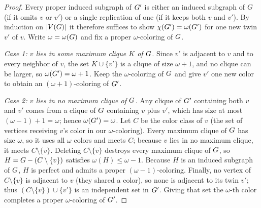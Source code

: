 \begin{proof}
Every proper induced subgraph of $G'$ is either an induced subgraph of $G$ (if it omits $v$ or $v'$) or a single replication of one (if it keeps both $v$ and $v'$). By induction on $\lvert V(G)\rvert$ it therefore suffices to show $\chi(G')=\omega(G')$ for one new twin $v'$ of $v$. Write $\omega=\omega(G)$ and fix a proper $\omega$-coloring of $G$.

\emph{Case 1: $v$ lies in some maximum clique $K$ of $G$.} Since $v'$ is adjacent to $v$ and to every neighbor of $v$, the set $K\cup\{v'\}$ is a clique of size $\omega+1$, and no clique can be larger, so $\omega(G')=\omega+1$. Keep the $\omega$-coloring of $G$ and give $v'$ one new color to obtain an $(\omega+1)$-coloring of $G'$.

\emph{Case 2: $v$ lies in no maximum clique of $G$.} Any clique of $G'$ containing both $v$ and $v'$ comes from a clique of $G$ containing $v$ plus $v'$, which has size at most $(\omega-1)+1=\omega$; hence $\omega(G')=\omega$. Let $C$ be the color class of $v$ (the set of vertices receiving $v$'s color in our $\omega$-coloring). Every maximum clique of $G$ has size $\omega$, so it uses all $\omega$ colors and meets $C$; because $v$ lies in no maximum clique, it meets $C\setminus\{v\}$. Deleting $C\setminus\{v\}$ destroys every maximum clique of $G$, so $H=G-(C\setminus\{v\})$ satisfies $\omega(H)\le\omega-1$. Because $H$ is an induced subgraph of $G$, $H$ is perfect and admits a proper $(\omega-1)$-coloring. Finally, no vertex of $C\setminus\{v\}$ is adjacent to $v$ (they shared a color), so none is adjacent to its twin $v'$; thus $(C\setminus\{v\})\cup\{v'\}$ is an independent set in $G'$. Giving that set the $\omega$-th color completes a proper $\omega$-coloring of $G'$.
\end{proof}

